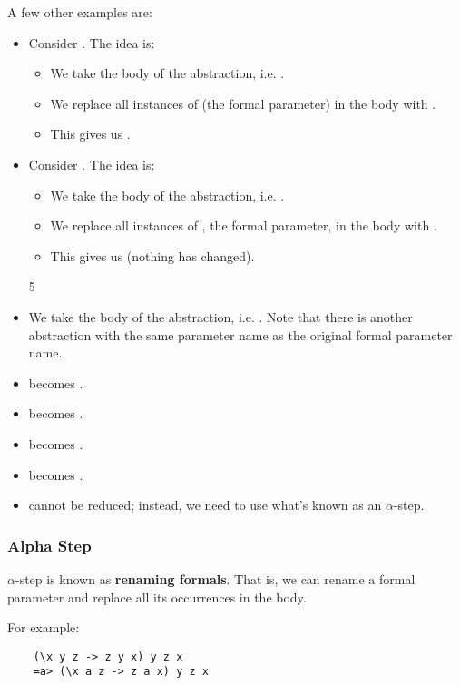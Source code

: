 \documentclass[letterpaper]{article}
\begin{document}
A few other examples are: 
\begin{itemize}
    \item Consider . The idea is: 
    \begin{itemize}
        \item We take the body of the abstraction, i.e. .
        \item We replace all instances of  (the formal parameter) in the body with .
        \item This gives us .
    \end{itemize}

    \item Consider . The idea is: 
    \begin{itemize}
        \item We take the body of the abstraction, i.e. .
        \item We replace all instances of , the formal parameter, in the body with .
        \item This gives us  (nothing has changed).  
    \end{itemize}

5        \item We take the body of the abstraction, i.e. . Note that there is another abstraction with the same parameter name as the original formal parameter name. 

    \item {} becomes .
    \item {} becomes .
    \item {} becomes .
    \item {} becomes .
    \item {} cannot be reduced; instead, we need to use what's known as an $\alpha$-step. 
\end{itemize}

\subsubsection{Alpha Step}
$\alpha$-step is known as \textbf{renaming formals}. That is, we can rename a formal parameter and replace all its occurrences in the body.

\bigskip 

For example: 
\begin{verbatim}
    (\x y z -> z y x) y z x 
    =a> (\x a z -> z a x) y z x
\end{verbatim}
\end{document}
